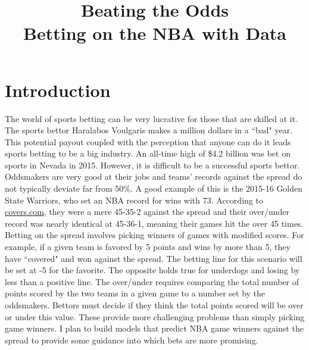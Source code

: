 \documentclass{article}
\title{Beating the Odds \\ Betting on the NBA with Data}
\date{\vspace{-5ex}}
\begin{document}
\maketitle
\section{Introduction}
The world of sports betting can be very lucrative for those that are skilled at it. The sports bettor Haralabos Voulgaris makes a million dollars in a ``bad" year. This potential payout coupled with the perception that anyone can do it leads sports betting to be a big industry. An all-time high of \$4.2 billion was bet on sports in Nevada in 2015. However, it is difficult to be a successful sports bettor. Oddsmakers are very good at their jobs and teams' records against the spread do not typically deviate far from 50\%. A good example of this is the 2015-16 Golden State Warriors, who set an NBA record for wins with 73. According to \href{http://www.covers.com/pageLoader/pageLoader.aspx?page=/data/nba/standings/2015-2016/sortable/standings_wins.html}{covers.com}, they were a mere 45-35-2 against the spread and their over/under record was nearly identical at 45-36-1, meaning their games hit the over 45 times. Betting on the spread involves picking winners of games with modified scores. For example, if a given team is favored by 5 points and wins by more than 5, they have ``covered" and won against the spread. The betting line for this scenario will be set at -5 for the favorite. The opposite holds true for underdogs and losing by less than a positive line. The over/under requires comparing the total number of points scored by the two teams in a given game to a number set by the oddsmakers. Bettors must decide if they think the total points scored will be over or under this value. These provide more challenging problems than simply picking game winners. I plan to build models that predict NBA game winners against the spread to provide some guidance into which bets are more promising.
\end{document}
